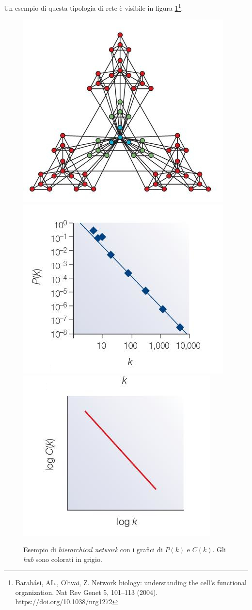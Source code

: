 \documentclass[a4paper,12pt, oneside]{book}
\begin{document}
Un esempio di questa tipologia di rete è visibile in figura
\ref{fig:sfnet}\footnote{Barabási, AL., Oltvai, Z. Network biology: understanding
  the cell's functional organization. Nat Rev Genet 5, 101–113
  (2004). https://doi.org/10.1038/nrg1272}.
\begin{figure}
  \centering
  \includegraphics[scale = 2.25]{img/hnet1.jpg}\\
  \includegraphics[scale = 1.75]{img/hnet2.jpg}
  \includegraphics[scale = 1.75]{img/hnet3.jpg}
  \caption{Esempio di \textit{hierarchical network} con i grafici di $P(k)$ e
    $C(k)$. Gli \textit{hub} sono colorati in grigio.} 
  \label{fig:sfnet}
\end{figure}
\end{document}
